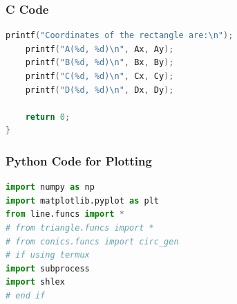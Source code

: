 \documentclass{beamer}
\theoremstyle{remark}
\numberwithin{equation}{section}
\begin{document}
\begin{frame}[fragile]
\frametitle{C Code }
\begin{lstlisting}[language=C]
       printf("Coordinates of the rectangle are:\n");
    printf("A(%d, %d)\n", Ax, Ay);
    printf("B(%d, %d)\n", Bx, By);
    printf("C(%d, %d)\n", Cx, Cy);
    printf("D(%d, %d)\n", Dx, Dy);

    return 0;
}
\end{lstlisting}
\end{frame}



\begin{frame}[fragile]
\frametitle{Python Code for Plotting}
\begin{lstlisting}[language=Python]
import numpy as np
import matplotlib.pyplot as plt
from line.funcs import *
# from triangle.funcs import *
# from conics.funcs import circ_gen
# if using termux
import subprocess
import shlex
# end if

\end{lstlisting}

\end{frame}
\end{document}
